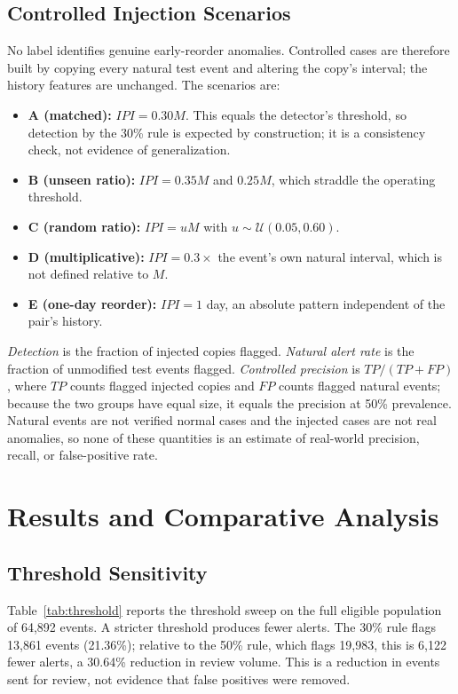\documentclass[conference]{IEEEtran}
\begin{document}
\subsection{Controlled Injection Scenarios}
No label identifies genuine early-reorder anomalies. Controlled cases are therefore built by copying every natural test event and altering the copy's interval; the history features are unchanged. The scenarios are:
\begin{itemize}
    \item \textbf{A (matched):} $IPI=0.30M$. This equals the detector's threshold, so detection by the 30\% rule is expected by construction; it is a consistency check, not evidence of generalization.
    \item \textbf{B (unseen ratio):} $IPI=0.35M$ and $0.25M$, which straddle the operating threshold.
    \item \textbf{C (random ratio):} $IPI=uM$ with $u\sim\mathcal{U}(0.05,0.60)$.
    \item \textbf{D (multiplicative):} $IPI=0.3\times$ the event's own natural interval, which is not defined relative to $M$.
    \item \textbf{E (one-day reorder):} $IPI=1$ day, an absolute pattern independent of the pair's history.
\end{itemize}
\emph{Detection} is the fraction of injected copies flagged. \emph{Natural alert rate} is the fraction of unmodified test events flagged. \emph{Controlled precision} is $TP/(TP+FP)$, where $TP$ counts flagged injected copies and $FP$ counts flagged natural events; because the two groups have equal size, it equals the precision at 50\% prevalence. Natural events are not verified normal cases and the injected cases are not real anomalies, so none of these quantities is an estimate of real-world precision, recall, or false-positive rate.

\section{Results and Comparative Analysis}
\subsection{Threshold Sensitivity}
Table~\ref{tab:threshold} reports the threshold sweep on the full eligible population of 64,892 events. A stricter threshold produces fewer alerts. The 30\% rule flags 13,861 events (21.36\%); relative to the 50\% rule, which flags 19,983, this is 6,122 fewer alerts, a 30.64\% reduction in review volume. This is a reduction in events sent for review, not evidence that false positives were removed.
\end{document}
